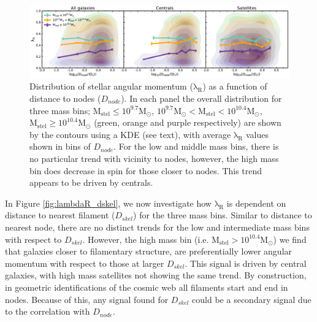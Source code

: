 \begin{figure}
    \centering\includegraphics[width=\linewidth]{thesis/latex/cw_spin/lambdaR_dnode_mass_split_3sigma.pdf}
    \caption{Distribution of stellar angular momentum ($\mathrm{\lambda_R}$) as a function of distance to nodes ($D_{node}$). In each panel the overall distribution for three mass bins; $\mathrm{M_{stel} \leq 10^{9.7} M_{\odot}}$, $\mathrm{10^{9.7}M_{\odot} < M_{stel} < 10^{10.4}M_{\odot}}$, $\mathrm{M_{stel} \geq 10^{10.4}M_{\odot}}$ (green, orange and purple respectively) are shown by the contours using a KDE (see text), with average $\mathrm{\lambda_R}$ values shown in bins of $D_{node}$. For the low and middle mass bins, there is no particular trend with vicinity to nodes, however, the high mass bin does decrease in spin for those closer to nodes. This trend appears to be driven by centrals.}
\label{fig:lambdaR_dnode}
\end{figure} 

In Figure \ref{fig:lambdaR_dskel}, we now investigate how $\mathrm{\lambda_R}$ is dependent on distance to nearest filament ($D_{skel}$) for the three mass bins. Similar to distance to nearest node, there are no distinct trends for the low and intermediate mass bins with respect to $D_{skel}$. However, the high mass bin (i.e. $\mathrm{M_{stel} > 10^{10.4}M_{\odot}}$) we find that galaxies closer to filamentary structure, are preferentially lower angular momentum with respect to those at larger $D_{skel}$. This signal is driven by central galaxies, with high mass satellites not showing the same trend. By construction, in geometric identifications of the cosmic web all filaments start and end in nodes. Because of this, any signal found for $D_{skel}$ could be a secondary signal due to the correlation with $D_{node}$. 

